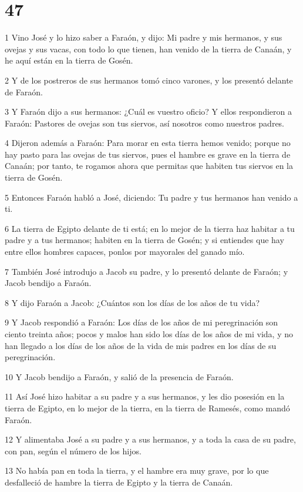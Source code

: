 \chapter{47}

\par 1 Vino José y lo hizo saber a Faraón, y dijo: Mi padre y mis hermanos, y sus ovejas y sus vacas, con todo lo que tienen, han venido de la tierra de Canaán, y he aquí están en la tierra de Gosén.
\par 2 Y de los postreros de sus hermanos tomó cinco varones, y los presentó delante de Faraón.
\par 3 Y Faraón dijo a sus hermanos: ¿Cuál es vuestro oficio? Y ellos respondieron a Faraón: Pastores de ovejas son tus siervos, así nosotros como nuestros padres.
\par 4 Dijeron además a Faraón: Para morar en esta tierra hemos venido; porque no hay pasto para las ovejas de tus siervos, pues el hambre es grave en la tierra de Canaán; por tanto, te rogamos ahora que permitas que habiten tus siervos en la tierra de Gosén.
\par 5 Entonces Faraón habló a José, diciendo: Tu padre y tus hermanos han venido a ti.
\par 6 La tierra de Egipto delante de ti está; en lo mejor de la tierra haz habitar a tu padre y a tus hermanos; habiten en la tierra de Gosén; y si entiendes que hay entre ellos hombres capaces, ponlos por mayorales del ganado mío.
\par 7 También José introdujo a Jacob su padre, y lo presentó delante de Faraón; y Jacob bendijo a Faraón.
\par 8 Y dijo Faraón a Jacob: ¿Cuántos son los días de los años de tu vida?
\par 9 Y Jacob respondió a Faraón: Los días de los años de mi peregrinación son ciento treinta años; pocos y malos han sido los días de los años de mi vida, y no han llegado a los días de los años de la vida de mis padres en los días de su peregrinación.
\par 10 Y Jacob bendijo a Faraón, y salió de la presencia de Faraón.
\par 11 Así José hizo habitar a su padre y a sus hermanos, y les dio posesión en la tierra de Egipto, en lo mejor de la tierra, en la tierra de Ramesés, como mandó Faraón.
\par 12 Y alimentaba José a su padre y a sus hermanos, y a toda la casa de su padre, con pan, según el número de los hijos.
\par 13 No había pan en toda la tierra, y el hambre era muy grave, por lo que desfalleció de hambre la tierra de Egipto y la tierra de Canaán.
